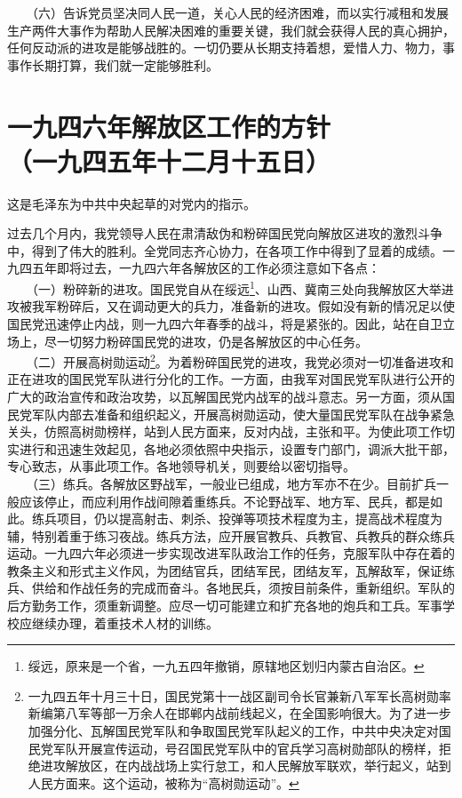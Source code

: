 \documentclass[cn,11pt,chinese]{elegantbook}
\def\myformat#1{\hfil\hfil #1}
\begin{document}
　　（六）告诉党员坚决同人民一道，关心人民的经济困难，而以实行减租和发展生产两件大事作为帮助人民解决困难的重要关键，我们就会获得人民的真心拥护，任何反动派的进攻是能够战胜的。一切仍要从长期支持着想，爱惜人力、物力，事事作长期打算，我们就一定能够胜利。\\
\newpage\section*{\myformat{一九四六年解放区工作的方针}\\\myformat{（一九四五年十二月十五日）}}
\begin{introduction}\item  这是毛泽东为中共中央起草的对党内的指示。\end{introduction}
过去几个月内，我党领导人民在肃清敌伪和粉碎国民党向解放区进攻的激烈斗争中，得到了伟大的胜利。全党同志齐心协力，在各项工作中得到了显着的成绩。一九四五年即将过去，一九四六年各解放区的工作必须注意如下各点：\\
　　（一）粉碎新的进攻。国民党自从在绥远\footnote[1]{ 绥远，原来是一个省，一九五四年撤销，原辖地区划归内蒙古自治区。}、山西、冀南三处向我解放区大举进攻被我军粉碎后，又在调动更大的兵力，准备新的进攻。假如没有新的情况足以使国民党迅速停止内战，则一九四六年春季的战斗，将是紧张的。因此，站在自卫立场上，尽一切努力粉碎国民党的进攻，仍是各解放区的中心任务。\\
　　（二）开展高树勋运动\footnote[2]{ 一九四五年十月三十日，国民党第十一战区副司令长官兼新八军军长高树勋率新编第八军等部一万余人在邯郸内战前线起义，在全国影响很大。为了进一步加强分化、瓦解国民党军队和争取国民党军队起义的工作，中共中央决定对国民党军队开展宣传运动，号召国民党军队中的官兵学习高树勋部队的榜样，拒绝进攻解放区，在内战战场上实行怠工，和人民解放军联欢，举行起义，站到人民方面来。这个运动，被称为“高树勋运动”。}。为着粉碎国民党的进攻，我党必须对一切准备进攻和正在进攻的国民党军队进行分化的工作。一方面，由我军对国民党军队进行公开的广大的政治宣传和政治攻势，以瓦解国民党内战军的战斗意志。另一方面，须从国民党军队内部去准备和组织起义，开展高树勋运动，使大量国民党军队在战争紧急关头，仿照高树勋榜样，站到人民方面来，反对内战，主张和平。为使此项工作切实进行和迅速生效起见，各地必须依照中央指示，设置专门部门，调派大批干部，专心致志，从事此项工作。各地领导机关，则要给以密切指导。\\
　　（三）练兵。各解放区野战军，一般业已组成，地方军亦不在少。目前扩兵一般应该停止，而应利用作战间隙着重练兵。不论野战军、地方军、民兵，都是如此。练兵项目，仍以提高射击、刺杀、投弹等项技术程度为主，提高战术程度为辅，特别着重于练习夜战。练兵方法，应开展官教兵、兵教官、兵教兵的群众练兵运动。一九四六年必须进一步实现改进军队政治工作的任务，克服军队中存在着的教条主义和形式主义作风，为团结官兵，团结军民，团结友军，瓦解敌军，保证练兵、供给和作战任务的完成而奋斗。各地民兵，须按目前条件，重新组织。军队的后方勤务工作，须重新调整。应尽一切可能建立和扩充各地的炮兵和工兵。军事学校应继续办理，着重技术人材的训练。\\
\end{document}
